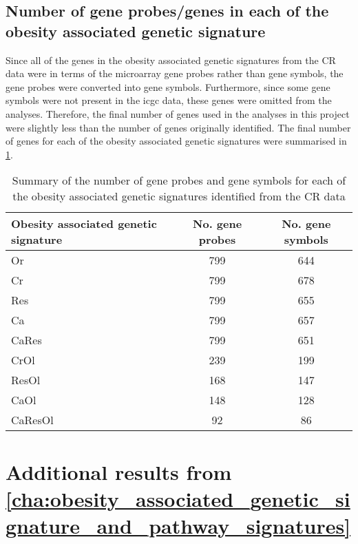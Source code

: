 \begin{appendices}
	\section{Number of gene probes/genes in each of the obesity associated genetic signature}
	\label{app:number_of_gene_probes_genes_in_each_signature}

	Since all of the genes in the obesity associated genetic signatures from the CR data were in terms of the microarray gene probes rather than gene symbols, the gene probes were converted into gene symbols.
	Furthermore, since some gene symbols were not present in the \gls{icgc} data, these genes were omitted from the analyses.
	Therefore, the final number of genes used in the analyses in this project were slightly less than the number of genes originally identified.
	The final number of genes for each of the obesity associated genetic signatures were summarised in \cref{tab:signature_gene_num}.

	\begin{table}[htbp]
		\centering
		\caption{Summary of the number of gene probes and gene symbols for each of the obesity associated genetic signatures identified from the CR data}
		\label{tab:signature_gene_num}
		\begin{tabular}{lcc}
			Obesity associated genetic signature & No. gene probes   & No. gene symbols\\
			\hline
			\rule{0pt}{2.25ex}Or & 799 & 644 \\
			Cr                   & 799 & 678 \\
			Res                  & 799 & 655 \\
			Ca                   & 799 & 657 \\
			CaRes                & 799 & 651 \\
			CrOl                 & 239 & 199 \\
			ResOl                & 168 & 147 \\
			CaOl                 & 148 & 128 \\
			CaResOl              & 92  & 86  \\
			\hline
			\hline
		\end{tabular}
	\end{table}

	\chapter{Additional results from \cref{cha:obesity_associated_genetic_signature_and_pathway_signatures}}
	\label{app:b}


\end{appendices}
